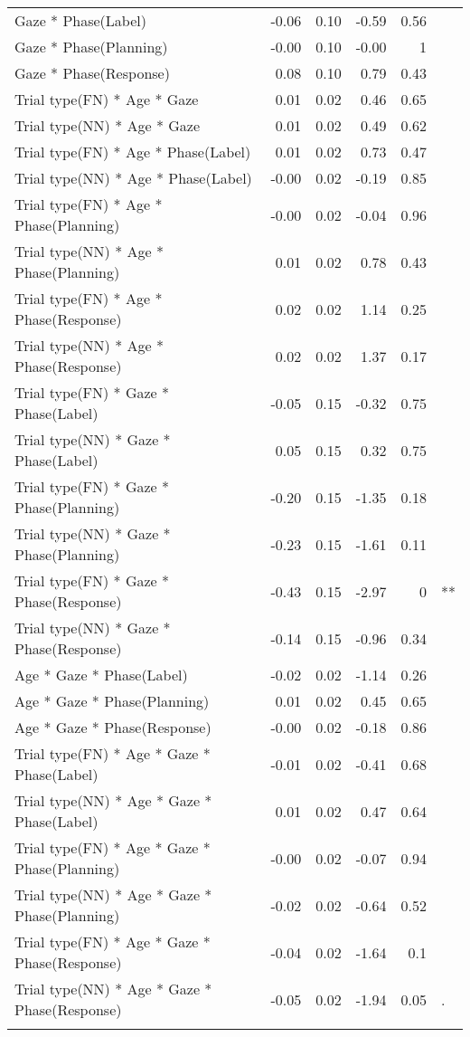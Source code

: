 \documentclass[english,man]{apa6}
\theoremstyle{definition}
\theoremstyle{definition}
\theoremstyle{definition}
\theoremstyle{remark}
\begin{document}
\begin{longtable}{lrrrrl}
  Gaze * Phase(Label) & -0.06 & 0.10 & -0.59 & 0.56 &  \\ 
  Gaze * Phase(Planning) & -0.00 & 0.10 & -0.00 & 1 &  \\ 
  Gaze * Phase(Response) & 0.08 & 0.10 & 0.79 & 0.43 &  \\ 
  Trial type(FN) * Age * Gaze & 0.01 & 0.02 & 0.46 & 0.65 &  \\ 
  Trial type(NN) * Age * Gaze & 0.01 & 0.02 & 0.49 & 0.62 &  \\ 
  Trial type(FN) * Age * Phase(Label) & 0.01 & 0.02 & 0.73 & 0.47 &  \\ 
  Trial type(NN) * Age * Phase(Label) & -0.00 & 0.02 & -0.19 & 0.85 &  \\ 
  Trial type(FN) * Age * Phase(Planning) & -0.00 & 0.02 & -0.04 & 0.96 &  \\ 
  Trial type(NN) * Age * Phase(Planning) & 0.01 & 0.02 & 0.78 & 0.43 &  \\ 
  Trial type(FN) * Age * Phase(Response) & 0.02 & 0.02 & 1.14 & 0.25 &  \\ 
  Trial type(NN) * Age * Phase(Response) & 0.02 & 0.02 & 1.37 & 0.17 &  \\ 
  Trial type(FN) * Gaze * Phase(Label) & -0.05 & 0.15 & -0.32 & 0.75 &  \\ 
  Trial type(NN) * Gaze * Phase(Label) & 0.05 & 0.15 & 0.32 & 0.75 &  \\ 
  Trial type(FN) * Gaze * Phase(Planning) & -0.20 & 0.15 & -1.35 & 0.18 &  \\ 
  Trial type(NN) * Gaze * Phase(Planning) & -0.23 & 0.15 & -1.61 & 0.11 &  \\ 
  Trial type(FN) * Gaze * Phase(Response) & -0.43 & 0.15 & -2.97 & 0 & ** \\ 
  Trial type(NN) * Gaze * Phase(Response) & -0.14 & 0.15 & -0.96 & 0.34 &  \\ 
  Age * Gaze * Phase(Label) & -0.02 & 0.02 & -1.14 & 0.26 &  \\ 
  Age * Gaze * Phase(Planning) & 0.01 & 0.02 & 0.45 & 0.65 &  \\ 
  Age * Gaze * Phase(Response) & -0.00 & 0.02 & -0.18 & 0.86 &  \\ 
  Trial type(FN) * Age * Gaze * Phase(Label) & -0.01 & 0.02 & -0.41 & 0.68 &  \\ 
  Trial type(NN) * Age * Gaze * Phase(Label) & 0.01 & 0.02 & 0.47 & 0.64 &  \\ 
  Trial type(FN) * Age * Gaze * Phase(Planning) & -0.00 & 0.02 & -0.07 & 0.94 &  \\ 
  Trial type(NN) * Age * Gaze * Phase(Planning) & -0.02 & 0.02 & -0.64 & 0.52 &  \\ 
  Trial type(FN) * Age * Gaze * Phase(Response) & -0.04 & 0.02 & -1.64 & 0.1 &  \\ 
  Trial type(NN) * Age * Gaze * Phase(Response) & -0.05 & 0.02 & -1.94 & 0.05 & . \\ 
   \hline
\hline
\label{tab:e2}
\end{longtable}
\end{document}
